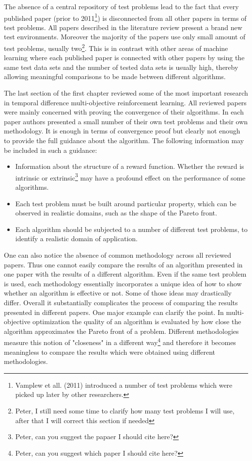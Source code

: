 The absence of a central repository of test problems lead to the fact that every published paper (prior to 2011\footnote{Vamplew et all. (2011)\nocite{vamplew2011empirical} introduced a number of test problems which were picked up later by other researchers.}) is disconnected from all other papers in terms of test problems. All papers described in the literature review present a brand new test environments. Moreover the majority of the papers use only small amount of test problems, usually two\footnote{Peter, I still need some time to clarify how many test problems I will use, after that I will correct this section if needed}. This is in contrast with other areas of machine learning where each published paper is connected with other papers by using the same test data sets and the number of tested data sets is usually high, thereby allowing meaningful comparisons to be made between different algorithms.

The last section of the first chapter reviewed some of the most important research in temporal difference multi-objective reinforcement learning. All reviewed papers were mainly concerned with proving the convergence of their algorithms. In each paper authors presented a small number of their own test problems and their own methodology. It is enough in terms of convergence proof but clearly not enough to provide the full guidance about the algorithm. The following information may be included in such a guidance:
\begin{itemize}
  \item Information about the structure of a reward function. Whether the reward is intrinsic or extrinsic\footnote{Peter, can you suggest the papaer I should cite here?} may have a profound effect on the performance of some algorithms.
  \item Each test problem must be built around particular property, which can be observed in realistic domains, such as the shape of the Pareto front.
  \item Each algorithm should be subjected to a number of different test problems, to identify a realistic domain of application.
\end{itemize}

One can also notice the absence of common methodology across all reviewed papers. Thus one cannot easily compare the results of an algorithm presented in one paper with the results of a different algorithm. Even if the same test problem is used, each methodology essentially incorporates a unique idea of how to show whether an algorithm is effective or not. Some of those ideas may drastically differ. Overall it substantially complicates the process of comparing the results presented in different papers. One major example can clarify the point. In multi-objective optimization the quality of an algorithm is evaluated by how close the algorithm approximates the Pareto front of a problem. Different methodologies measure this notion of "closeness" in a different way\footnote{Peter, can you suggest which paper I should cite here?} and therefore it becomes meaningless to compare the results which were obtained using different methodologies.

